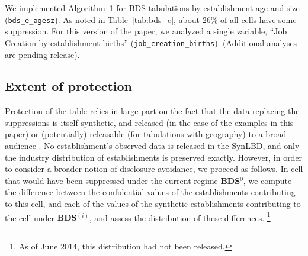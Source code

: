 We implemented Algorithm~1 for \ac{BDS} tabulations by establishment age and size ({\tt bds\_e\_agesz}). As noted in Table~\ref{tab:bds_e}, about 26\% of all cells have some suppression. For this version of the paper, we analyzed a single variable, ``Job Creation by establishment births'' ({\tt job\_creation\_births}). (Additional analyses are pending release). 

\subsection{Extent of protection}
\label{sec:protection}

Protection of the table relies in large part on the fact that the data replacing the suppressions is 
itself synthetic, and released (in the case of the examples in this paper) or (potentially) 
releasable (for tabulations with geography) to a broad audience \cite{AbowdVilhuber2010}. No 
establishment's observed data is released in the SynLBD, and only the industry distribution of 
establishments is preserved exactly. However, in order to consider a broader notion of 
disclosure avoidance, we proceed as follows. In cell that would have been suppressed under 
the current regime \textbf{BDS$^{0}$},  we compute the difference between the confidential 
values of the establishments contributing to this cell, and each of the values of the synthetic 
establishments contributing to the cell under \textbf{BDS$^{(i)}$}, and assess the distribution of 
these differences.%
\footnote{As of June 2014, this distribution had not been released.}


